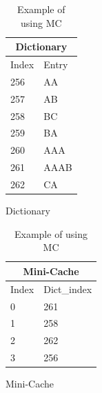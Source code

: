 \begin{table}
    \begin{minipage}{.45\textwidth}
        \centering
        \begin{tabular}{|l|l|}
        \hline
        \multicolumn{2}{c}{Dictionary}  \\ \hline
        Index           & Entry         \\ \hline
        256             & AA            \\ 
        257             & AB            \\ 
        258             & BC            \\ 
        259             & BA            \\
        260             & AAA           \\
        261             & AAAB          \\
        262             & CA            \\
        \hline
        \end{tabular}
    \caption{Dictionary}
    \end{minipage}
    \hfill
    \begin{minipage}{.45\textwidth}
        \centering
        \begin{tabular}{|l|l|}
        \hline
        \multicolumn{2}{c}{Mini-Cache}  \\ \hline
        Index        & Dict\_index      \\ \hline
        0            & 261              \\
        1            & 258              \\
        2            & 262              \\
        3            & 256              \\
        \hline
        \end{tabular}
    \caption{Mini-Cache}
    \end{minipage}
   
    \caption{Example of using MC}
    \label{table:MC}
\end{table}

